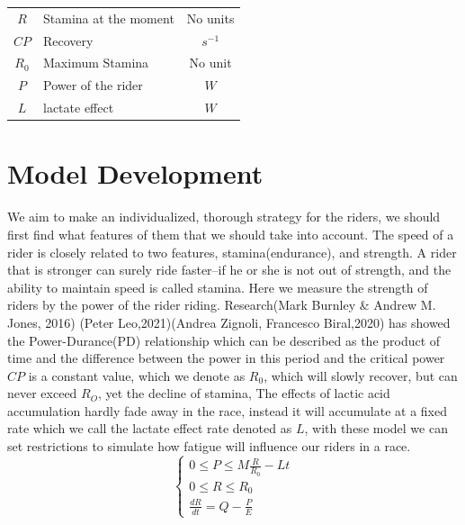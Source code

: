 \documentclass[12pt]{article}
\begin{document}
\begin{center}
{\begin{tabular}{clc}
            $R$           & Stamina at the moment                                   & No units    \\
            $CP$          & Recovery                                                & $s^{-1}$    \\
            $R_0$         & Maximum Stamina                                         & No unit     \\
            $P$           & Power of the rider                                      & $W$         \\
            $L$           & lactate effect                                          & $W$         \\
            \bottomrule
        \end{tabular}
    }
\end{center}
\section{Model Development}
We aim to make an individualized, thorough strategy for the riders, we should first find what features of them that we should take into account.
The speed of a rider
is closely related to two features, stamina(endurance), and strength. A rider that is stronger can surely ride faster--if he or she is not out of strength, and the ability
to maintain speed is called stamina.
Here we measure the strength of riders by the power of the rider riding. Research(Mark Burnley \& Andrew M. Jones, 2016)\cite{doi:10.1080/17461391.2016.1249524}
(Peter Leo,2021)\cite{leo2021power}(Andrea Zignoli, Francesco Biral,2020)\cite{zignoli2020prediction}
has showed the Power-Durance(PD) relationship
which can be described as the product of time and the difference between the power in this period and the critical power $CP$ is a constant value, which we
denote as $R_0$, which will slowly recover, but can never exceed $R_O$, yet the decline of stamina, The effects of lactic acid accumulation hardly fade away in the race, instead it will accumulate at a fixed rate which we call the lactate effect rate
denoted as $L$, with these model we can set restrictions  to simulate how fatigue will influence our riders in a race.
\begin{equation}
    \left\{
    \begin{array}{c}
        0                \leqslant  P  \leqslant  M\frac{R}{R_0}-Lt \\
        0                \leqslant  R  \leqslant  R_0               \\
        \frac{d R}{d t}  =          Q  -          \frac{P}{E}
    \end{array}
    \right.
\end{equation}
\end{document}
